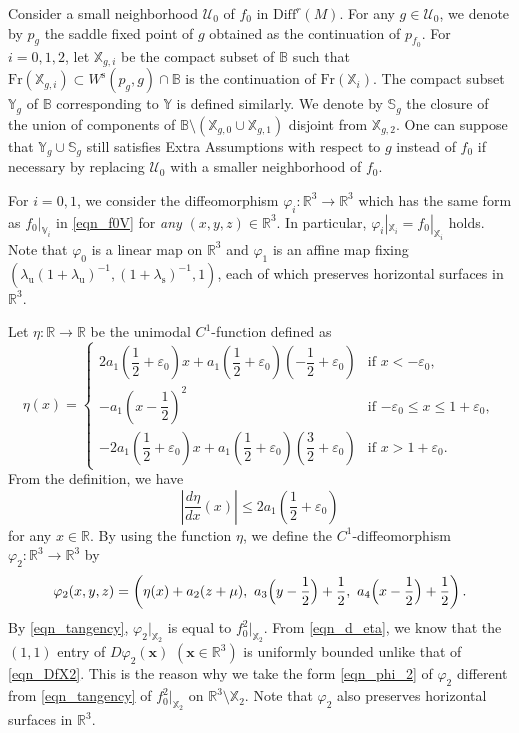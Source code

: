 \documentclass{amsart}
\theoremstyle{plain}
\theoremstyle{definition}
\theoremstyle{remark}
\numberwithin{equation}{section}
\def\smfd{W^{\mathrm{s}}}
\def\vv{\mathbb{V}}
\def\xx{\mathbb{X}}
\def\yy{\mathbb{Y}}
\def\bx{{\boldsymbol{x}}}
\begin{document}
Consider a small neighborhood $\mathcal{U}_0$ of $f_0$ in $\mathrm{Diff}^r(M)$.
For any $g\in \mathcal{U}_0$, we denote by $p_g$ the saddle fixed point of $g$ obtained as the continuation of $p_{f_0}$.
For $i=0,1,2$, let $\xx_{g,i}$  be the compact subset of $\mathbb{B}$ such that $\mathrm{Fr}(\xx_{g,i})\subset \smfd(p_g,g)\cap \mathbb{B}$ is the continuation of $\mathrm{Fr}(\xx_i)$.
The compact subset $\yy_g$ of $\mathbb{B}$ corresponding to $\yy$ 
is defined similarly.
We denote by $\mathbb{S}_g$ the closure of the union of components of $\mathbb{B}\setminus (\xx_{g,0}\cup \xx_{g,1})$ disjoint from $\xx_{g,2}$.
One can suppose that $\yy_g\cup \mathbb{S}_g$ still satisfies Extra Assumptions with respect to $g$ instead of $f_0$ 
if necessary by replacing $\mathcal{U}_0$ with a smaller neighborhood of $f_0$.
 



For $i=0,1$, we consider the diffeomorphism $\varphi_i:\mathbb{R}^3\longrightarrow \mathbb{R}^3$ which has the same form as $f_0|_{\vv_i}$ in \eqref{eqn_f0V} for \emph{any} $(x,y,z)\in \mathbb{R}^3$.
In particular, $\varphi_i|_{\xx_i}=f_0|_{\xx_i}$ holds.
Note that $\varphi_0$ is a linear map on $\mathbb{R}^3$ and $\varphi_1$ 
is an affine map fixing $(\lambda_{\mathrm u}(1+\lambda_{\mathrm u})^{-1},
(1+\lambda_{\mathrm s})^{-1},1)$, 
each of which preserves horizontal surfaces in $\mathbb{R}^3$.


Let $\eta:\mathbb{R}\longrightarrow \mathbb{R}$  be the unimodal $C^1$-function defined as 
\[
\eta(x)=\begin{cases}
2a_1\left(\dfrac12+\varepsilon_0\right)x+a_1\left(\dfrac12+\varepsilon_0\right)\!\left(-\dfrac12+\varepsilon_0\right) &
\text{if $x<-\varepsilon_0$},\\[4pt]
-a_1\left(x-\dfrac12\right)^2&\text{if $-\varepsilon_0\leq x\leq 1+\varepsilon_0$},\\[4pt]
-2a_1\left(\dfrac12+\varepsilon_0\right)x+a_1\left(\dfrac12+\varepsilon_0\right)\!\left(\dfrac32+\varepsilon_0\right) &
\text{if $x>1+\varepsilon_0$}.
\end{cases}
\]
From the definition, we have
\begin{equation}\label{eqn_d_eta}
\left|\frac{d\eta}{dx}(x)\right|\leq 2a_1\left(\frac12+\varepsilon_0\right)
\end{equation}
for  any $x\in\mathbb{R}$.
By using the function $\eta$, we define the $C^1$-diffeomorphism $\varphi_2:\mathbb{R}^3\longrightarrow \mathbb{R}^3$ by    
\begin{equation}\label{eqn_phi_2}
\varphi_{2}(x,y,z)=\left(\eta(x)+a_{2}(z+\mu),\ a_{3}\Bigl(y-\frac{1}{2}\Bigr)+\frac{1}{2},\ 
a_{4}\Bigl(x-\frac{1}{2}\Bigr)+\frac{1}{2} \right).
\end{equation}
By \eqref{eqn_tangency}, $\varphi_2|_{\xx_2}$ is equal to $f_0^2|_{\xx_2}$.
From \eqref{eqn_d_eta}, we know that the $(1,1)$ entry of $D\varphi_2(\bx)$ $(\bx\in \mathbb{R}^3)$ is  uniformly bounded unlike that of \eqref{eqn_DfX2}.
This is the reason why we take the form \eqref{eqn_phi_2} of $\varphi_2$ different from \eqref{eqn_tangency} of $f_0^2|_{\xx_2}$ on $\mathbb{R}^3\setminus \xx_2$. 
Note that $\varphi_2$ also preserves horizontal surfaces in $\mathbb{R}^3$.
\end{document}
